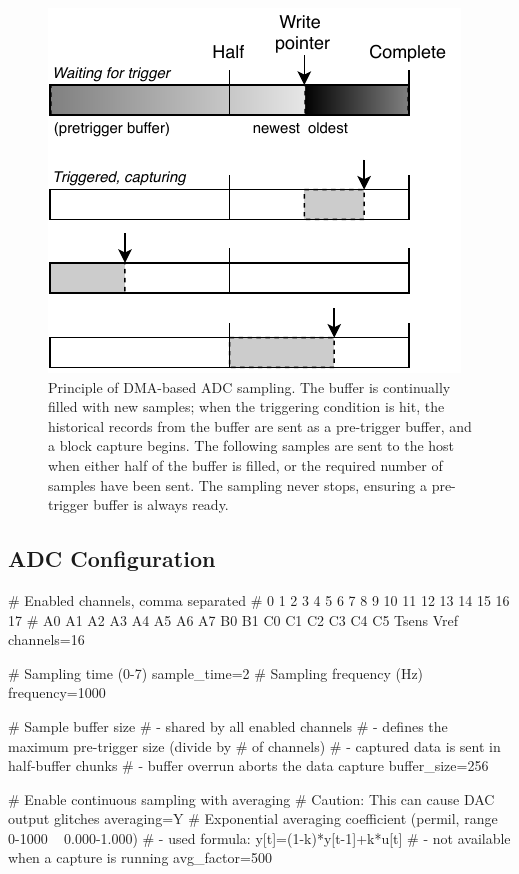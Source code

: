 \begin{figure}[h]
	\centering
	\includegraphics[scale=1]{img/adc-dma-buf.pdf}
	\caption[Principle of DMA-based ADC sampling]{\label{fig:adc_dma}Principle of DMA-based ADC sampling. The buffer is continually filled with new samples; when the triggering condition is hit, the historical records from the buffer are sent as a pre-trigger buffer, and a block capture begins. The following samples are sent to the host when either half of the buffer is filled, or the required number of samples have been sent. The sampling never stops, ensuring a pre-trigger buffer is always ready.}
\end{figure}

\subsection{ADC Configuration}

\begin{inicode}
# Enabled channels, comma separated
#  0  1  2  3  4  5  6  7    8  9   10 11 12 13 14 15   16    17
# A0 A1 A2 A3 A4 A5 A6 A7   B0 B1   C0 C1 C2 C3 C4 C5   Tsens Vref
channels=16

# Sampling time (0-7)
sample_time=2
# Sampling frequency (Hz)
frequency=1000

# Sample buffer size
# - shared by all enabled channels
# - defines the maximum pre-trigger size (divide by # of channels)
# - captured data is sent in half-buffer chunks
# - buffer overrun aborts the data capture
buffer_size=256

# Enable continuous sampling with averaging
# Caution: This can cause DAC output glitches
averaging=Y
# Exponential averaging coefficient (permil, range 0-1000 ~ 0.000-1.000)
# - used formula: y[t]=(1-k)*y[t-1]+k*u[t]
# - not available when a capture is running
avg_factor=500
\end{inicode}

